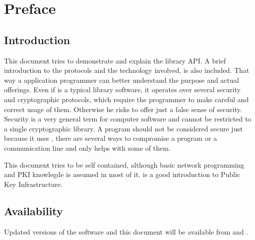 \chapter*{Preface}

\section*{Introduction}
This document tries to demonstrate and explain the \gnutls{} library API.
A brief introduction to the protocols and the technology involved, is
also included. That way a \tls{} application programmer can better understand
the \gnutls{} purpose and actual offerings. 
Even if \gnutls{} is a typical library software, it operates over several
security and cryptographic protocols, which require the programmer
to make careful and correct usage of them. Otherwise he risks to offer
just a false sense of security. Security is a very general term for computer
software and cannot be restricted to a single cryptographic library.
A program should not be considered secure just because it uses \gnutls{},
there are several ways to compromise a program or a communication line
and \gnutls{} only helps with some of them. 
\par
This document tries to be self contained, although basic 
network programming and PKI knowlegde is assumed in most of it. 
\cite{GUTPKI} is a good introduction to Public Key Infrastructure.

\section*{Availability}
Updated versions of the \gnutls{} software and this document will
be available from
and .
